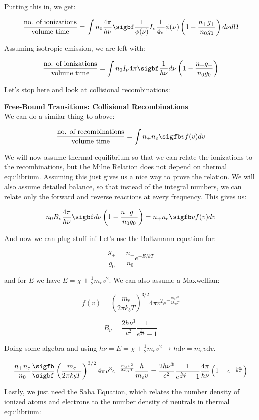 \documentclass{article}
\newcommand{\planck}{\frac{2h\nu^3}{c^2} \frac{1}{e^{\frac{h\nu}{kT}} - 1}}
\begin{document}
Putting this in, we get:

$$
\frac{\text{no. of ionizations}}{\text{volume}\text{ time}} = \int n_0 \frac{4\pi}{h\nu} \sigbf \frac{1}{\phi(\nu)} I_\nu \frac{1}{4\pi} \phi(\nu)\left(1 - \frac{n_+ g_+}{n_0 g_0}\right) d\nu d\Omega
$$

Assuming isotropic emission, we are left with:

$$
\frac{\text{no. of ionizations}}{\text{volume}\text{ time}} = \int n_0 I_\nu 4\pi \sigbf \frac{1}{h\nu} d\nu \left(1 - \frac{n_+ g_+}{n_0 g_0}\right)
$$

Let's stop here and look at collisional recombinations:


\textbf{Free-Bound Transitions: Collisional Recombinations}\\

We can do a similar thing to above:

$$
\frac{\text{no. of recombinations}}{\text{volume}\text{ time}} = \int n_+ n_e \sigfb v f(v) dv
$$

We will now assume thermal equilibrium so that we can relate the ionizations to the recombinations, but {\textbf the Milne Relation does not depend on thermal equilibrium}. Assuming this just gives us a nice way to prove the relation. We will also assume detailed balance, so that instead of the integral numbers, we can relate only the forward and reverse reactions at every frequency. This gives us:

$$
n_0 B_\nu \frac{4\pi}{h\nu}\sigbf d\nu \left(1 - \frac{n_+ g_+}{n_0 g_0}\right) = n_+ n_e \sigfb v f(v) dv
$$

And now we can plug stuff in! Let's use the Boltzmann equation for:

$$
\frac{g_+}{g_0} = \frac{n_+}{n_0} e^{-E/kT}
$$

and for $E$ we have $E = \chi + \frac12 m_e v^2$. We can also assume a Maxwellian:

$$
f(v) = \left(\frac{m_e}{2 \pi k_b T}\right)^{3/2} 4 \pi v^2 e^{-\frac{m_e v^2}{2k_B T}}
$$

$$
B_\nu = \planck
$$

Doing some algebra and using $h\nu = E = \chi + \frac12 m_e v^2 \rightarrow h \mathrm{d}\nu = m_e v \mathrm{d} v$.

$$
\frac{n_+ n_e}{n_0}\frac{\sigfb}{\sigbf} \left(\frac{m_e}{2 \pi k_b T}\right)^{3/2} 4\pi v^3 e^{-\frac{m_e v^2}{2k_B T}} \frac{h}{m_e v} = \planck \frac{4\pi}{h\nu} \left(1 - e^{-\frac{h\nu}{kT}}\right)
$$

Lastly, we just need the Saha Equation, which relates the number density of ionized atoms and electrons to the number density of neutrals in thermal equilibrium:
\end{document}
